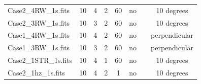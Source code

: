 \documentclass[11pt]{article}      %
\begin{document}
\begin{table}[hb]
\begin{footnotesize}
\begin{tabular}{| p{5.5cm} | c | c | c | c  | c | c | c |}
      Case2\_4RW\_1s.fits & 10 & 4 & 2 & 60 & no & & 10 degrees \\
      Case2\_3RW\_1s.fits & 10 & 3 & 2 & 60 & no & & 10 degrees \\
      Case1\_4RW\_1s.fits & 10 & 4 & 2 & 60 & no & & perpendicular \\
      Case1\_3RW\_1s.fits & 10 & 3 & 2 & 60 & no & & perpendicular \\
      Case2\_1STR\_1s.fits & 10 & 4 & 1 & 60 & no & & 10 degrees \\
      Case2\_1hz\_1s.fits & 10 & 4 & 2 & 1 & no & & 10 degrees \\
      \hline
    \end{tabular}

  \end{footnotesize}
  \label{tab:jitter2}
\end{table}

\else
\end{document}
